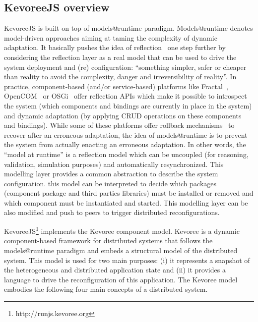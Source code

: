 \subsection{KevoreeJS overview }
KevoreeJS is built on top of models@runtime paradigm. Models@runtime denotes model-driven approaches aiming at taming the complexity of dynamic adaptation. It basically pushes the idea of reflection~\cite{DBLP:conf/icse/MorinBNJ09} one step further by considering the reflection layer as a real model that can be used to drive the system deployment and (re) configuration: ``something simpler, safer or cheaper than reality to avoid the complexity, danger and irreversibility of reality''. In practice, component-based (and/or service-based) platforms like Fractal~\cite{bruneton2006fractal}, OpenCOM~\cite{} or OSGi~\cite{hall2011osgi} offer reflection APIs which make it possible to introspect the system (which components and bindings are currently in place in the system) and dynamic adaptation (by applying CRUD operations on these components and bindings). While some of these platforms offer rollback mechanisms~\cite{} to recover after an erroneous adaptation, the idea of models@runtime is to prevent the system from actually enacting an erroneous adaptation. In other words, the ``model at runtime'' is a reflection model which can be uncoupled (for reasoning, validation, simulation purposes) and automatically resynchronized. This modelling layer provides a common abstraction to describe the system configuration. this model can be interpreted to decide which packages (component package and third parties libraries) must be installed or removed and which component must be instantiated and started. This modelling layer can be also modified and push to peers to trigger distributed reconfigurations. 

KevoreeJS\footnote{http://runjs.kevoree.org}  implements the Kevoree component model. Kevoree is a dynamic component-based framework for distributed systems that follows the models@runtime paradigm and embeds a structural model of the distributed system. This model is used for two main purposes: (i) it represents a snapshot of the heterogeneous and distributed application state and (ii) it provides a language to drive the reconfiguration of this application. The Kevoree model embodies the following four main concepts of a distributed system. 

